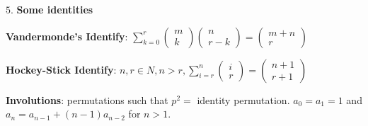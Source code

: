 $5.$ \textbf{Some identities}


\textbf{Vandermonde's Identify}: $\sum_{k=0}^r\left(\begin{array}{c}m \\ k\end{array}\right)\left(\begin{array}{c}n \\ r-k\end{array}\right)=\left(\begin{array}{c}m+n \\ r\end{array}\right)$ 

\textbf{Hockey-Stick Identify}: $n, r \in N, n>r, \sum_{i=r}^n\left(\begin{array}{l}i \\ r\end{array}\right)=\left(\begin{array}{l}n+1 \\ r+1\end{array}\right)$

\textbf{Involutions}: permutations such that $p^2=$ identity permutation. $a_0=a_1=1$ and $a_n=a_{n-1}+(n-1) a_{n-2}$ for $n>1$.